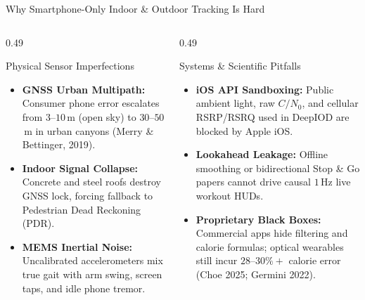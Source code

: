 \documentclass[aspectratio=169,10pt]{beamer}
\begin{document}
\begin{frame}{Why Smartphone-Only Indoor \& Outdoor Tracking Is Hard}
  \begin{columns}[T]
    \begin{column}{0.49\textwidth}
      \begin{block}{Physical Sensor Imperfections}
        \begin{itemize}\small
          \item \textbf{GNSS Urban Multipath:} Consumer phone error escalates from $3$--$10$\,m (open sky) to $30$--$50$\,m in urban canyons (Merry \& Bettinger, 2019).
          \item \textbf{Indoor Signal Collapse:} Concrete and steel roofs destroy GNSS lock, forcing fallback to Pedestrian Dead Reckoning (PDR).
          \item \textbf{MEMS Inertial Noise:} Uncalibrated accelerometers mix true gait with arm swing, screen taps, and idle phone tremor.
        \end{itemize}
      \end{block}
    \end{column}
    \begin{column}{0.49\textwidth}
      \begin{alertblock}{Systems \& Scientific Pitfalls}
        \begin{itemize}\small
          \item \textbf{iOS API Sandboxing:} Public ambient light, raw $C/N_0$, and cellular RSRP/RSRQ used in DeepIOD are blocked by Apple iOS.
          \item \textbf{Lookahead Leakage:} Offline smoothing or bidirectional Stop \& Go papers cannot drive causal $1$\,Hz live workout HUDs.
          \item \textbf{Proprietary Black Boxes:} Commercial apps hide filtering and calorie formulas; optical wearables still incur $28$--$30\%+$ calorie error (Choe 2025; Germini 2022).
        \end{itemize}
      \end{alertblock}
    \end{column}
  \end{columns}
\end{frame}
\end{document}
